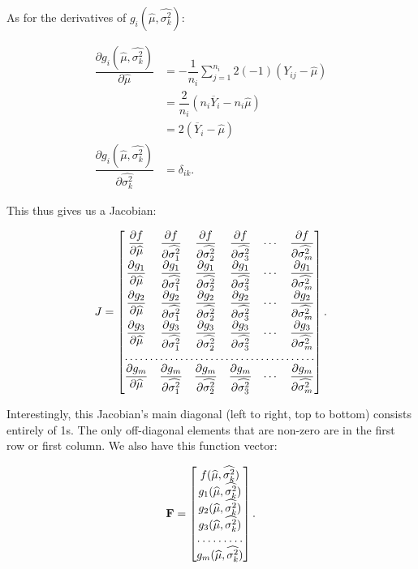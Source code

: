 \documentclass[12pt,a4paper,openright]{article}
\newcommand{\ovY}{\overline{Y}}
\newcommand{\wmu}{\widehat{\mu}}
\newcommand{\wst}[1]{\widehat{\sigma^2_#1}}
\begin{document}
	As for the derivatives of $g_i(\wmu, \widehat{\sigma^2_k})$:
	
	\begin{align*}
		\dfrac{\partial g_i(\wmu, \widehat{\sigma^2_k})}{\partial \wmu} &= -\dfrac{1}{n_i} \sum_{j=1}^{n_i} 2(-1)(Y_{ij}-\wmu) \\
		&= \dfrac{2}{n_i} (n_i\ovY_i - n_i\wmu) \\
		&= 2(\ovY_i-\wmu) \\
		\dfrac{\partial g_i(\wmu, \widehat{\sigma^2_k})}{\partial \widehat{\sigma^2_k}} &= \delta_{ik}.
	\end{align*}

	This thus gives us a Jacobian:
	
	\begin{align*}
		J = \left[\begin{matrix}
			\dfrac{\partial f}{\partial \wmu} & \dfrac{\partial f}{\partial \wst{1}} & \dfrac{\partial f}{\partial \wst{2}} & \dfrac{\partial f}{\partial \wst{3}} & \cdots & \dfrac{\partial f}{\partial \wst{m}} \\
			\dfrac{\partial g_1}{\partial \wmu} & \dfrac{\partial g_1}{\partial \wst{1}} & \dfrac{\partial g_1}{\partial \wst{2}} & \dfrac{\partial g_1}{\partial \wst{3}} & \cdots & \dfrac{\partial g_1}{\partial \wst{m}} \\
			\dfrac{\partial g_2}{\partial \wmu} & \dfrac{\partial g_2}{\partial \wst{1}} & \dfrac{\partial g_2}{\partial \wst{2}} & \dfrac{\partial g_2}{\partial \wst{3}} & \cdots & \dfrac{\partial g_2}{\partial \wst{m}} \\
			\dfrac{\partial g_3}{\partial \wmu} & \dfrac{\partial g_3}{\partial \wst{1}} & \dfrac{\partial g_3}{\partial \wst{2}} & \dfrac{\partial g_3}{\partial \wst{3}} & \cdots & \dfrac{\partial g_3}{\partial \wst{m}} \\
			\hdotsfor{6} \\
			\dfrac{\partial g_m}{\partial \wmu} & \dfrac{\partial g_m}{\partial \wst{1}} & \dfrac{\partial g_m}{\partial \wst{2}} & \dfrac{\partial g_m}{\partial \wst{3}} & \cdots & \dfrac{\partial g_m}{\partial \wst{m}}
		\end{matrix}\right].
	\end{align*}

	Interestingly, this Jacobian's main diagonal (left to right, top to bottom) consists entirely of 1s. The only off-diagonal elements that are non-zero are in the first row or first column. We also have this function vector:
	
	\begin{align*}
		\mathbf{F} = \left[
		\begin{matrix}
			f(\wmu, \wst{k}) \\
			g_1(\wmu, \wst{k}) \\
			g_2(\wmu, \wst{k}) \\
			g_3(\wmu, \wst{k}) \\
			\hdotsfor{1} \\
			g_m(\wmu, \wst{k})
		\end{matrix}
	\right].
	\end{align*}
\end{document}
